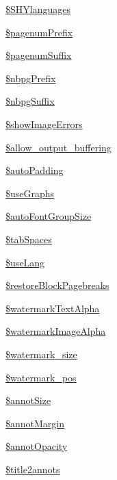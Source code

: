 \begin{DoxyCompactItemize}
\item 
\hyperlink{classm_p_d_f_a062911bd6b95bf03618486410d216d83}{\$\-S\-H\-Ylanguages}
\item 
\hyperlink{classm_p_d_f_a22bc03ba931feb329ee80a196e8c243b}{\$pagenum\-Prefix}
\item 
\hyperlink{classm_p_d_f_a2bc35ab6e04ae7a92f3612794bc3af59}{\$pagenum\-Suffix}
\item 
\hyperlink{classm_p_d_f_a7f572b33139b6eaea8a8764dc6343796}{\$nbpg\-Prefix}
\item 
\hyperlink{classm_p_d_f_a11f7587b140781c619da10aa1386c245}{\$nbpg\-Suffix}
\item 
\hyperlink{classm_p_d_f_a05b0ef5956c10ad0acffa2d7e222acda}{\$show\-Image\-Errors}
\item 
\hyperlink{classm_p_d_f_af3eab47d1b1b923c622b8d05271fcea7}{\$allow\-\_\-output\-\_\-buffering}
\item 
\hyperlink{classm_p_d_f_a0b38b39973aaa6e04780874343323e03}{\$auto\-Padding}
\item 
\hyperlink{classm_p_d_f_af27db575d81609f526052f2918f52a7f}{\$use\-Graphs}
\item 
\hyperlink{classm_p_d_f_a039d7c98f0657542a3bc0804567a6fb6}{\$auto\-Font\-Group\-Size}
\item 
\hyperlink{classm_p_d_f_a26888a78726fdd478ba530ab066372a6}{\$tab\-Spaces}
\item 
\hyperlink{classm_p_d_f_a333dbef5325ee77fbf688f6087687f09}{\$use\-Lang}
\item 
\hyperlink{classm_p_d_f_adacc41a5b412bd9a054b8a4096125fbe}{\$restore\-Block\-Pagebreaks}
\item 
\hyperlink{classm_p_d_f_af23e6616d8015797919f1dd5ed983dd4}{\$watermark\-Text\-Alpha}
\item 
\hyperlink{classm_p_d_f_abb84267f02b5b9bc0a2f7085edf1edb4}{\$watermark\-Image\-Alpha}
\item 
\hyperlink{classm_p_d_f_a8ec79be726fd8e5b845c70c44853c469}{\$watermark\-\_\-size}
\item 
\hyperlink{classm_p_d_f_aec5f34e9a46d180fe6769c17f54b6e50}{\$watermark\-\_\-pos}
\item 
\hyperlink{classm_p_d_f_aeafb91d3b7c79b8dfcc0ce58c0795060}{\$annot\-Size}
\item 
\hyperlink{classm_p_d_f_a77ad146999fbc0d7deb9e8909bed4b1c}{\$annot\-Margin}
\item 
\hyperlink{classm_p_d_f_a2b396b03cfcc7326915d70529b77b82c}{\$annot\-Opacity}
\item 
\hyperlink{classm_p_d_f_a172a3adc2b2e47098dc674bffd91baab}{\$title2annots}

\end{DoxyCompactItemize}
